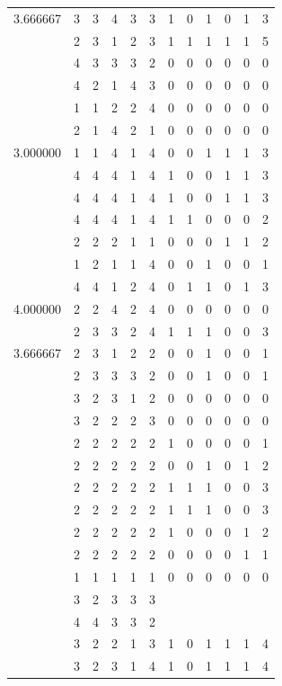 \documentclass[]{book}
\theoremstyle{definition}
\theoremstyle{definition}
\theoremstyle{definition}
\theoremstyle{remark}
\begin{document}
\begin{table}
{\begin{tabular}[t]{rrrrrrrrrrrr}
3.666667 & 3 & 3 & 4 & 3 & 3 & 1 & 0 & 1 & 0 & 1 & 3\\
 & 2 & 3 & 1 & 2 & 3 & 1 & 1 & 1 & 1 & 1 & 5\\
 & 4 & 3 & 3 & 3 & 2 & 0 & 0 & 0 & 0 & 0 & 0\\
 & 4 & 2 & 1 & 4 & 3 & 0 & 0 & 0 & 0 & 0 & 0\\
 & 1 & 1 & 2 & 2 & 4 & 0 & 0 & 0 & 0 & 0 & 0\\
 & 2 & 1 & 4 & 2 & 1 & 0 & 0 & 0 & 0 & 0 & 0\\
3.000000 & 1 & 1 & 4 & 1 & 4 & 0 & 0 & 1 & 1 & 1 & 3\\
 & 4 & 4 & 4 & 1 & 4 & 1 & 0 & 0 & 1 & 1 & 3\\
 & 4 & 4 & 4 & 1 & 4 & 1 & 0 & 0 & 1 & 1 & 3\\
 & 4 & 4 & 4 & 1 & 4 & 1 & 1 & 0 & 0 & 0 & 2\\
 & 2 & 2 & 2 & 1 & 1 & 0 & 0 & 0 & 1 & 1 & 2\\
 & 1 & 2 & 1 & 1 & 4 & 0 & 0 & 1 & 0 & 0 & 1\\
 & 4 & 4 & 1 & 2 & 4 & 0 & 1 & 1 & 0 & 1 & 3\\
4.000000 & 2 & 2 & 4 & 2 & 4 & 0 & 0 & 0 & 0 & 0 & 0\\
 & 2 & 3 & 3 & 2 & 4 & 1 & 1 & 1 & 0 & 0 & 3\\
3.666667 & 2 & 3 & 1 & 2 & 2 & 0 & 0 & 1 & 0 & 0 & 1\\
 & 2 & 3 & 3 & 3 & 2 & 0 & 0 & 1 & 0 & 0 & 1\\
 & 3 & 2 & 3 & 1 & 2 & 0 & 0 & 0 & 0 & 0 & 0\\
 & 3 & 2 & 2 & 2 & 3 & 0 & 0 & 0 & 0 & 0 & 0\\
 & 2 & 2 & 2 & 2 & 2 & 1 & 0 & 0 & 0 & 0 & 1\\
 & 2 & 2 & 2 & 2 & 2 & 0 & 0 & 1 & 0 & 1 & 2\\
 & 2 & 2 & 2 & 2 & 2 & 1 & 1 & 1 & 0 & 0 & 3\\
 & 2 & 2 & 2 & 2 & 2 & 1 & 1 & 1 & 0 & 0 & 3\\
 & 2 & 2 & 2 & 2 & 2 & 1 & 0 & 0 & 0 & 1 & 2\\
 & 2 & 2 & 2 & 2 & 2 & 0 & 0 & 0 & 0 & 1 & 1\\
 & 1 & 1 & 1 & 1 & 1 & 0 & 0 & 0 & 0 & 0 & 0\\
 & 3 & 2 & 3 & 3 & 3 &  &  &  &  &  & \\
 & 4 & 4 & 3 & 3 & 2 &  &  &  &  &  & \\
 & 3 & 2 & 2 & 1 & 3 & 1 & 0 & 1 & 1 & 1 & 4\\
 & 3 & 2 & 3 & 1 & 4 & 1 & 0 & 1 & 1 & 1 & 4\\

\end{tabular}}
\end{table}
\end{document}
